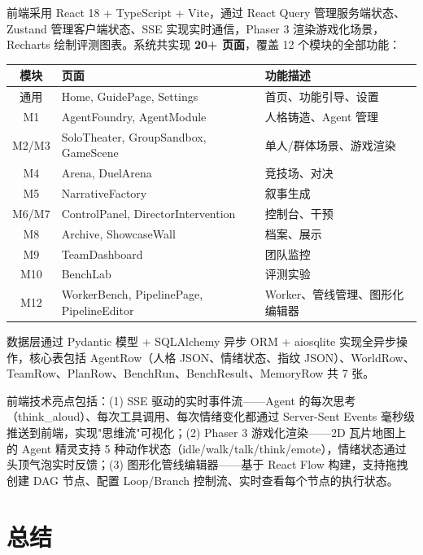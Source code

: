 \documentclass[12pt,a4paper]{article}%
\begin{document}
前端采用 React 18 + TypeScript + Vite，通过 React Query 管理服务端状态、Zustand 管理客户端状态、SSE 实现实时通信，Phaser 3 渲染游戏化场景，Recharts 绘制评测图表。系统共实现 \textbf{20+ 页面}，覆盖 12 个模块的全部功能：

\begin{table}[H]
	\centering
	\small
	\begin{tabular}{clp{6cm}}
		\toprule
		\textbf{模块} & \textbf{页面} & \textbf{功能描述} \\
		\midrule
		通用 & Home, GuidePage, Settings & 首页、功能引导、设置 \\
		M1 & AgentFoundry, AgentModule & 人格铸造、Agent 管理 \\
		M2/M3 & SoloTheater, GroupSandbox, GameScene & 单人/群体场景、游戏渲染 \\
		M4 & Arena, DuelArena & 竞技场、对决 \\
		M5 & NarrativeFactory & 叙事生成 \\
		M6/M7 & ControlPanel, DirectorIntervention & 控制台、干预 \\
		M8 & Archive, ShowcaseWall & 档案、展示 \\
		M9 & TeamDashboard & 团队监控 \\
		M10 & BenchLab & 评测实验 \\
		M12 & WorkerBench, PipelinePage, PipelineEditor & Worker、管线管理、图形化编辑器 \\
		\bottomrule
	\end{tabular}
\end{table}

数据层通过 Pydantic 模型 + SQLAlchemy 异步 ORM + aiosqlite 实现全异步操作，核心表包括 AgentRow（人格 JSON、情绪状态、指纹 JSON）、WorldRow、TeamRow、PlanRow、BenchRun、BenchResult、MemoryRow 共 7 张。

前端技术亮点包括：(1) SSE 驱动的实时事件流——Agent 的每次思考（think\_aloud）、每次工具调用、每次情绪变化都通过 Server-Sent Events 毫秒级推送到前端，实现"思维流"可视化；(2) Phaser 3 游戏化渲染——2D 瓦片地图上的 Agent 精灵支持 5 种动作状态（idle/walk/talk/think/emote），情绪状态通过头顶气泡实时反馈；(3) 图形化管线编辑器——基于 React Flow 构建，支持拖拽创建 DAG 节点、配置 Loop/Branch 控制流、实时查看每个节点的执行状态。

\section{总结}
\end{document}
